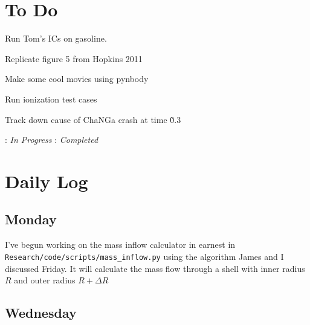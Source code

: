 \documentclass[11pt,letterpaper]{article}
\begin{document}
\section{To Do}
\begin{bullets}
\item[\checkmark] Run Tom's ICs on gasoline.
\item[\textleaf] Replicate figure 5 from Hopkins 2011
\item[\checkmark] Make some cool movies using pynbody
\item[\textleaf] Run ionization test cases
\item Track down cause of ChaNGa crash at time \~0.3
\end{bullets}

\textleaf : \textit{In Progress} \qquad \checkmark : \textit{Completed}
\section{Daily Log}

\subsection{Monday}

I've begun working on the mass inflow calculator in earnest in
\verb!Research/code/scripts/mass_inflow.py! using the algorithm James
and I discussed Friday. It will calculate the mass flow through a shell
with inner radius $R$ and outer radius $R+\Delta R$

\subsection{Wednesday}
\end{document}
